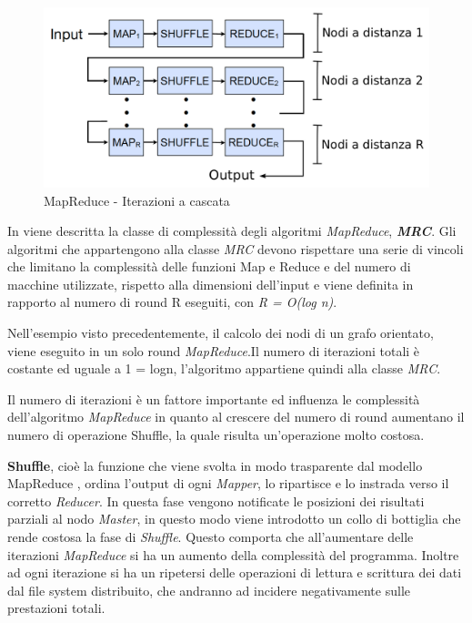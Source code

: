 \documentclass[LaM,binding=0.6cm]{sapthesis}
\begin{document}
\begin{figure}
\centering
\includegraphics[width=1\textwidth]{MR_cascata}
\caption{MapReduce - Iterazioni a cascata}
\label{fig:MR_cascata}
\end{figure}

In \cite{Karloff:2010:MCM:1873601.1873677} viene descritta la classe di complessità degli algoritmi \textit{MapReduce}, \textbf{\textit{MRC}}. 
Gli algoritmi che appartengono alla classe \textit{MRC} devono rispettare una serie di vincoli che limitano la complessità delle funzioni Map e Reduce e del numero di macchine utilizzate, rispetto alla dimensioni dell'input e viene definita in rapporto al numero di round R eseguiti, con \textit{R = O(log n)}.

Nell'esempio visto precedentemente, il calcolo dei nodi di un grafo orientato, viene eseguito in un solo round \textit{MapReduce}.Il numero di iterazioni totali è costante ed uguale a 1 = logn, l'algoritmo appartiene quindi alla classe \textit{MRC}.	

Il numero di iterazioni è un fattore importante ed influenza le complessità dell'algoritmo \textit{MapReduce} in quanto al crescere del numero di round aumentano il numero di operazione Shuffle, la quale risulta un'operazione molto costosa.

\textbf{Shuffle}, cioè la funzione che viene svolta in modo trasparente dal modello MapReduce \cite{Dean:2008:MSD:1327452.1327492}, ordina l'output di ogni \textit{Mapper}, lo ripartisce e lo instrada verso il corretto \textit{Reducer}. In questa fase vengono notificate le posizioni dei risultati parziali al nodo \textit{Master}, in questo modo viene introdotto un collo di bottiglia che rende costosa la fase di \textit{Shuffle}. Questo comporta che all'aumentare delle iterazioni \textit{MapReduce} si ha un aumento della complessità del programma. Inoltre ad ogni iterazione si ha un ripetersi delle operazioni di lettura e scrittura dei dati dal file system distribuito, che andranno ad incidere negativamente sulle prestazioni totali.
\end{document}
